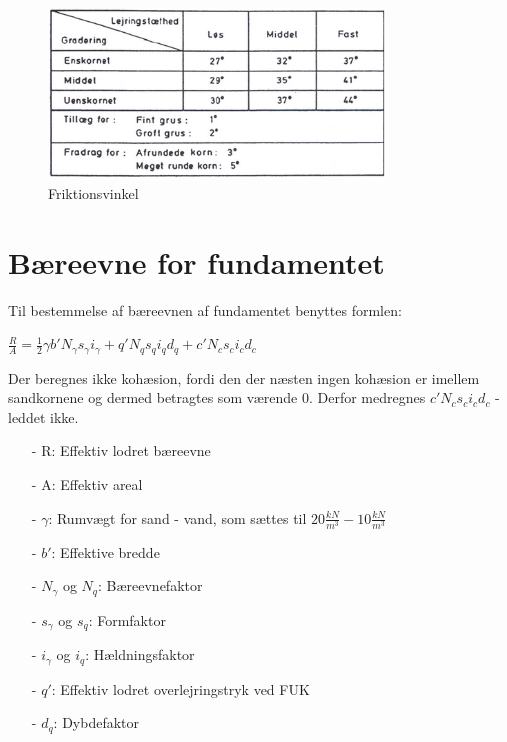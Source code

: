 \begin{figure}[htbp]
	\centering
	\includegraphics[width=0.8\textwidth]{billeder/friktionsvinkel.png}
	\caption{Friktionsvinkel \citep[ s. 170]{geoteknik}}
	\label{fig:friktionsvinkel}
\end{figure}

\section{Bæreevne for fundamentet}
Til bestemmelse af bæreevnen af fundamentet benyttes formlen:
\begin{center}
	$\frac{R}{A} = \frac{1}{2} \gamma  b' N_\gamma s_\gamma i_\gamma + q' N_q s_q i_q d_q + c' N_c s_c i_c d_c$
\end{center}

Der beregnes ikke kohæsion, fordi den der næsten ingen kohæsion er imellem sandkornene og dermed betragtes som værende 0. Derfor medregnes $c'N_c s_c i_c d_c$ -leddet ikke.

\begin{itemize}
	\item[-] R: Effektiv lodret bæreevne
	\item[-] A: Effektiv areal
	\item[-] $\gamma$: Rumvægt for sand - vand, som sættes til $20\frac{kN}{m^3} - 10\frac{kN}{m^3}$
	\item[-] $b'$: Effektive bredde
	\item[-] $N_{\gamma}$ og $N_q$: Bæreevnefaktor
	\item[-] $s_\gamma$ og $s_q$: Formfaktor
	\item[-] $i_\gamma$ og $i_q$: Hældningsfaktor
	\item[-] $q'$: Effektiv lodret overlejringstryk ved FUK
	\item[-] $d_q$: Dybdefaktor
\end{itemize}

